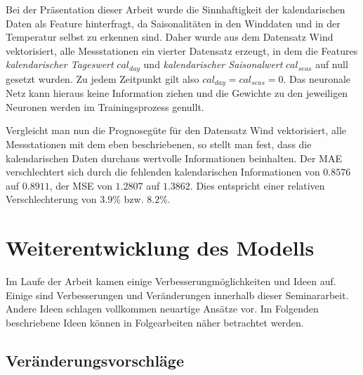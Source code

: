 \documentclass[
12pt, %
toc=listofnumbered, %
toc=chapterentrydotfill, %
numbers=noenddot, %
captions=tableheading, %
bibliography=numbered
]{scrreprt}
\let\Oldsection\section
\renewcommand{\section}{\FloatBarrier\Oldsection}
\let\Oldsubsection\subsection
\renewcommand{\subsection}{\FloatBarrier\Oldsubsection}
\newcommand{\qm}[1]{\glqq#1\grqq{}} %
\begin{document}
Bei der Präsentation dieser Arbeit wurde die Sinnhaftigkeit der kalendarischen Daten als Feature hinterfragt, da Saisonalitäten in den Winddaten und in der Temperatur selbst zu erkennen sind. Daher wurde aus dem Datensatz \qm{Wind vektorisiert, alle Messstationen} ein vierter Datensatz erzeugt, in dem die Features \textit{kalendarischer Tageswert} $cal_{day}$ und \textit{kalendarischer Saisonalwert} $cal_{seas}$ auf null gesetzt wurden. Zu jedem Zeitpunkt gilt also $cal_{day} = cal_{seas} = 0$. Das neuronale Netz kann hieraus keine Information ziehen und die Gewichte zu den jeweiligen Neuronen werden im Trainingsprozess \qm{genullt}.

Vergleicht man nun die Prognosegüte für den Datensatz \qm{Wind vektorisiert, alle Messstationen} mit dem eben beschriebenen, so stellt man fest, dass die kalendarischen Daten durchaus wertvolle Informationen beinhalten. Der MAE verschlechtert sich durch die fehlenden kalendarischen Informationen von $0.8576$ auf $0.8911$, der MSE von $1.2807$ auf $1.3862$. Dies entspricht einer relativen Verschlechterung von $3.9\%$ bzw. $8.2\%$.


\section{Weiterentwicklung des Modells}

Im Laufe der Arbeit kamen einige Verbesserungmöglichkeiten und Ideen auf. Einige sind Verbesserungen und Veränderungen innerhalb dieser Seminararbeit. 
Andere Ideen schlagen vollkommen neuartige Ansätze vor. Im Folgenden beschriebene Ideen können in Folgearbeiten näher betrachtet werden.

\subsection{Veränderungsvorschläge}
\end{document}
